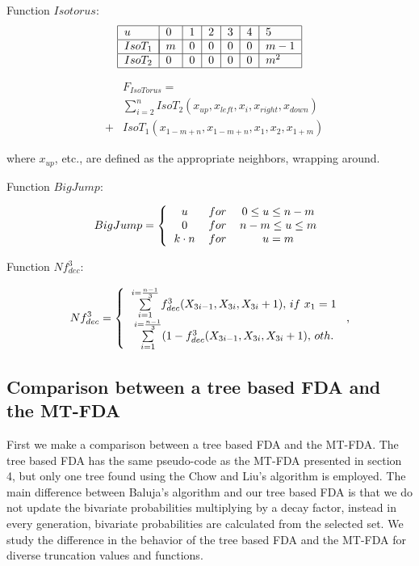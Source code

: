 \documentclass[10pt,thmsa]{article}
\begin{document}
Function $Isotorus$:\medskip 
\begin{equation}
\begin{tabular}{|l|l|l|l|l|l|l|}
\hline
$u$ & $0$ & $1$ & $2$ & $3$ & $4$ & $5$ \\ \hline
$IsoT_1$ & \multicolumn{1}{|r|}{$m$} & $0$ & $0$ & $0$ & $0$ & $m-1$ \\ 
\hline
$IsoT_2$ & $0$ & $0$ & $0$ & $0$ & $0$ & $m^2$ \\ \hline
\end{tabular}
\label{Isotorus table}
\end{equation}

\begin{eqnarray}
&&F_{IsoTorus}=  \label{Isotorus} \\
&&\sum\nolimits_{i=2}^nIsoT_2(x_{up},x_{left},x_i,x_{right},x_{down}) \\
&+&IsoT_1(x_{1-m+n},x_{1-m+n},x_1,x_2,x_{1+m})
\end{eqnarray}

where $x_{up}$, etc., are defined as the appropriate neighbors, wrapping
around.

Function $BigJump$:

\begin{equation}
BigJump=\left\{ 
\begin{tabular}{ccc}
$u$ & $for$ & $0\leq u\leq n-m$ \\ 
$0$ & $for$ & $n-m\leq u\leq m$ \\ 
$k\cdot n$ & $for$ & $u=m$%
\end{tabular}
\right.  \label{BigJump Function}
\end{equation}

Function $Nf_{dec}^3$:

\begin{equation}
Nf_{dec}^3=\left\{ 
\begin{tabular}{c}
$\sum\limits_{i=1}^{i=\frac{n-1}3}f_{dec}^3(X_{3i-1},X_{3i},X_{3i}+1),$ $if$ 
$x_1=1$ \\ 
$\sum\limits_{i=1}^{i=\frac{n-1}3}(1-f_{dec}^3(X_{3i-1},X_{3i},X_{3i}+1),$ $%
oth.$%
\end{tabular}
\right. \text{,}
\end{equation}

\subsection{Comparison between a tree based FDA and the MT-FDA}

\smallskip First we make a comparison between a tree based FDA and the
MT-FDA. The tree based FDA has the same pseudo-code as the MT-FDA presented
in section 4, but only one tree found using the Chow and Liu's algorithm is
employed. The main difference between Baluja's algorithm and our tree based
FDA is that we do not update the bivariate probabilities multiplying by a
decay factor, instead in every generation, bivariate probabilities are
calculated from the selected set. We study the difference in the behavior of
the tree based FDA and the MT-FDA for diverse truncation values and
functions.
\end{document}
